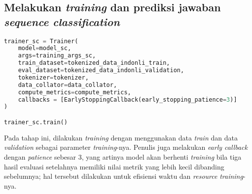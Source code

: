 \subsection{Melakukan \emph{training} dan prediksi jawaban \emph{sequence classification}}
\begin{lstlisting}[language=Python, caption=Melakukan \emph{training} dan prediksi jawaban \emph{sequence classification}]
trainer_sc = Trainer(
    model=model_sc,
    args=training_args_sc,
    train_dataset=tokenized_data_indonli_train,
    eval_dataset=tokenized_data_indonli_validation,
    tokenizer=tokenizer,
    data_collator=data_collator,
    compute_metrics=compute_metrics,
    callbacks = [EarlyStoppingCallback(early_stopping_patience=3)]
)

trainer_sc.train()
\end{lstlisting}

Pada tahap ini, dilakukan \emph{training} dengan menggunakan data \emph{train} dan data \emph{validation} sebagai parameter \emph{training}-nya. Penulis juga melakukan \emph{early callback} dengan \emph{patience} sebesar 3, yang artinya model akan berhenti \emph{training} bila tiga hasil evaluasi setelahnya memiliki nilai metrik yang lebih kecil dibanding sebelumnya; hal tersebut dilakukan untuk efisiensi waktu dan \emph{resource} \emph{training}-nya.

